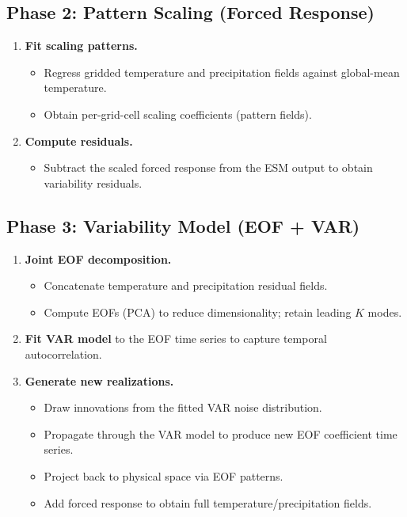 \documentclass[11pt,a4paper]{article}
\begin{document}
\subsection{Phase 2: Pattern Scaling (Forced Response)}
\begin{enumerate}[label=\textbf{2.\arabic*}]
  \item \textbf{Fit scaling patterns.}
    \begin{itemize}
      \item Regress gridded temperature and precipitation fields against global-mean temperature.
      \item Obtain per-grid-cell scaling coefficients (pattern fields).
    \end{itemize}
  \item \textbf{Compute residuals.}
    \begin{itemize}
      \item Subtract the scaled forced response from the ESM output to obtain variability residuals.
    \end{itemize}
\end{enumerate}

\subsection{Phase 3: Variability Model (EOF + VAR)}
\begin{enumerate}[label=\textbf{3.\arabic*}]
  \item \textbf{Joint EOF decomposition.}
    \begin{itemize}
      \item Concatenate temperature and precipitation residual fields.
      \item Compute EOFs (PCA) to reduce dimensionality; retain leading $K$ modes.
    \end{itemize}
  \item \textbf{Fit VAR model} to the EOF time series to capture temporal autocorrelation.
  \item \textbf{Generate new realizations.}
    \begin{itemize}
      \item Draw innovations from the fitted VAR noise distribution.
      \item Propagate through the VAR model to produce new EOF coefficient time series.
      \item Project back to physical space via EOF patterns.
      \item Add forced response to obtain full temperature/precipitation fields.
    \end{itemize}
\end{enumerate}
\end{document}
